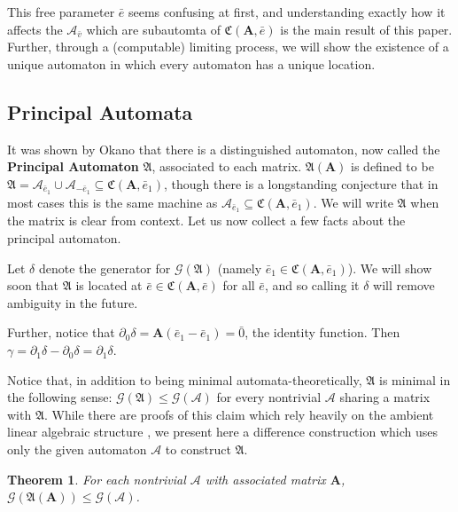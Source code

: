 \documentclass[12pt]{article}
\newcommand{\A}{\mathcal{A}}
\newcommand{\G}{\mathcal{G}}
\renewcommand{\P}{\mathfrak{A}}
\newcommand{\C}{\mathfrak{C}(\Am,\e)}
\newcommand{\2}{\textbf{2}}
\newcommand{\Am}{\textbf{A}}
\newcommand{\del}{\partial}
\renewcommand{\v}{\bar{v}}
\newcommand{\e}{\bar{e}}
\newtheorem{thm}{Theorem}
\begin{document}
This free parameter $\e$ seems confusing at first, and understanding exactly
how it affects the $\A_{\v}$ which are subautomta of $\C$ is the main result 
of this paper. Further, through a (computable) limiting process, we will show 
the existence of a unique automaton in which every automaton has a 
unique location.

\subsection{Principal Automata}
It was shown by Okano \cite{Okano15:thesis} that there is a 
distinguished automaton, now called the \textbf{Principal Automaton} $\P$, 
associated to each matrix. $\P(\Am)$ is defined to be 
$\P = \A_{\e_1} \cup \A_{-\e_1} \subseteq \mathfrak{C}(\Am, \e_1)$,
though there is a longstanding conjecture that in most cases this is
the same machine as $\A_{\e_1} \subseteq \mathfrak{C}(\Am, \e_1)$.
We will write $\P$ when the matrix is clear from context.
Let us now collect a few facts about the principal automaton.

Let $\delta$ denote the generator for $\G(\P)$ 
(namely $\e_1 \in \mathfrak{C}(\Am, \e_1)$). We will show soon
that $\P$ is located at $\e \in \C$ for all $\e$,
and so calling it $\delta$ will remove ambiguity in the future.

Further, notice that $\del_0 \delta = \Am(\e_1 - \e_1) = \bar{0}$, 
the identity function. 
Then $\gamma = \del_1 \delta - \del_0 \delta = \del_1 \delta$.

Notice that, in addition to being minimal automata-theoretically, 
$\P$ is minimal in the following sense: 
$\G(\P) \leq \G(\A)$ for every nontrivial $\A$ sharing a matrix with $\P$. 
While there are proofs of this claim which rely heavily on the
ambient linear algebraic structure \cite{Okano15:thesis}, 
we present here a difference construction which uses only the given 
automaton $\A$ to construct $\P$.

\begin{thm}
  For each nontrivial $\A$ with associated matrix $\Am$, 
  $\G(\P(\Am)) \leq \G(\A)$.
\end{thm}
\end{document}
